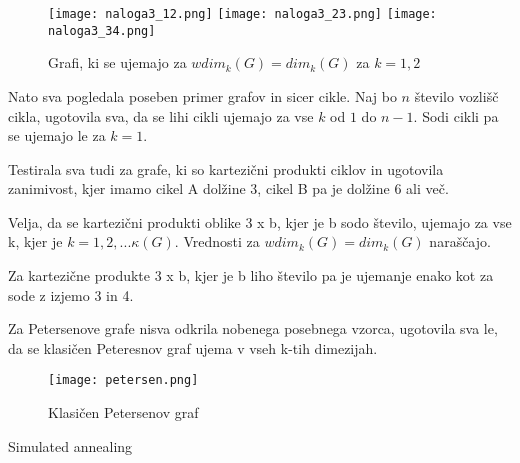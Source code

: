 \documentclass[12pt,a4paper]{amsart}
\makeatletter
\renewcommand\section{\@startsection{section}{1}%
  \z@{.5\linespacing\@plus.7\linespacing}{.5\linespacing}%
  {\normalfont\scshape\large\centering}}
\theoremstyle{plain} %
\makeatother
\begin{document}
\bigskip


\bigskip

\bigskip

\bigskip

\bigskip

\bigskip

\bigskip

\bigskip

\bigskip
\begin{figure}[h]
    \centering
    \texttt{[image: naloga3\_12.png]}
    \texttt{[image: naloga3\_23.png]}
    \texttt{[image: naloga3\_34.png]}
    \caption{Grafi, ki se ujemajo za $wdim_k(G)=dim_k(G)$ za $k = 1,2$}
    \label{fig:slika1}
\end{figure}

\bigskip

Nato sva pogledala poseben primer grafov in sicer cikle.
Naj bo $n$ število vozlišč cikla, ugotovila sva, da se lihi cikli ujemajo za vse $k$ od $1$ do $n - 1$.
Sodi cikli pa se ujemajo le za $k = 1$. 

Testirala sva tudi za grafe, ki so kartezični produkti ciklov in ugotovila zanimivost, kjer imamo cikel A dolžine 3, cikel B 
pa je dolžine 6 ali več.

Velja, da se kartezični produkti oblike 3 x b, kjer je b sodo število, ujemajo za vse k, kjer je
$k = 1, 2, ... \kappa(G)$. Vrednosti za $wdim_k(G)=dim_k(G)$ naraščajo.

Za kartezične produkte 3 x b, kjer je b liho število pa je ujemanje enako kot za sode z izjemo 3 in 4.

\bigskip
Za Petersenove grafe nisva odkrila nobenega posebnega vzorca, ugotovila sva le, da se klasičen Peteresnov graf
ujema v vseh k-tih dimezijah.

\begin{figure}[h]
    \centering
    \texttt{[image: petersen.png]}
    \caption{Klasičen Petersenov graf}
    \label{fig:slika1}
\end{figure}


\section{Simulated annealing}
\end{document}
